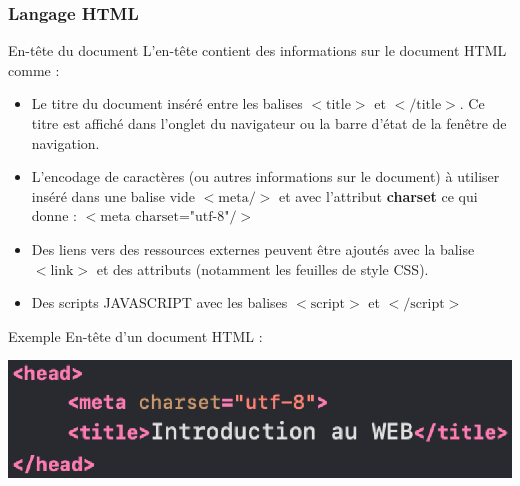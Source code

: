 \documentclass[8pt]{beamer}
\begin{document}
\begin{frame}
\frametitle{Langage HTML}

\begin{block}{En-tête du document}
L'en-tête contient des informations sur le document HTML comme :
\begin{itemize}
\item Le titre du document inséré entre les balises $<\text{title}>$ et $</\text{title}>$. Ce titre est affiché dans l'onglet du navigateur ou la barre d'état de la fenêtre de navigation.
\item L'encodage de caractères (ou autres informations sur le document) à utiliser inséré dans une balise vide $<\text{meta} />$ et avec l'attribut \textbf{charset} ce qui donne : $<\text{meta charset="utf-8"}/>$
\item Des liens vers des ressources externes peuvent être ajoutés avec la balise  $<\text{link}>$ et des attributs (notamment les feuilles de style CSS).
\item Des scripts JAVASCRIPT avec les balises $<\text{script}>$ et $</\text{script}>$
\end{itemize}

\end{block}

\begin{exampleblock}{Exemple}
En-tête d'un document HTML :
\begin{center}
\includegraphics[scale=0.38]{img/exemple2-code.eps}
\end{center}
\end{exampleblock}

\end{frame}
\end{document}
